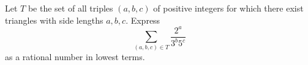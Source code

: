 Let $T$ be the set of all triples $(a,b,c)$ of positive integers for which there exist triangles with side lengths $a,b,c$. Express
\[
\sum_{(a,b,c) \in T} \frac{2^a}{3^b 5^c} 
\]
as a rational number in lowest terms.
